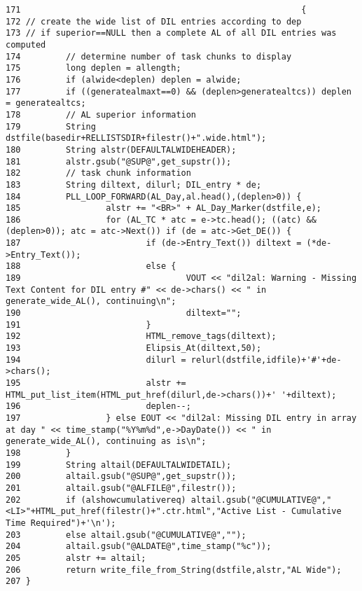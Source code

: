 \footnotesize\begin{verbatim}171                                                        {
172 // create the wide list of DIL entries according to dep
173 // if superior==NULL then a complete AL of all DIL entries was computed
174         // determine number of task chunks to display
175         long deplen = allength;
176         if (alwide<deplen) deplen = alwide;
177         if ((generatealmaxt==0) && (deplen>generatealtcs)) deplen = generatealtcs;
178         // AL superior information
179         String dstfile(basedir+RELLISTSDIR+filestr()+".wide.html");
180         String alstr(DEFAULTALWIDEHEADER);
181         alstr.gsub("@SUP@",get_supstr());
182         // task chunk information
183         String diltext, dilurl; DIL_entry * de;
184         PLL_LOOP_FORWARD(AL_Day,al.head(),(deplen>0)) {
185                 alstr += "<BR>" + AL_Day_Marker(dstfile,e);
186                 for (AL_TC * atc = e->tc.head(); ((atc) && (deplen>0)); atc = atc->Next()) if (de = atc->Get_DE()) {
187                         if (de->Entry_Text()) diltext = (*de->Entry_Text());
188                         else {
189                                 VOUT << "dil2al: Warning - Missing Text Content for DIL entry #" << de->chars() << " in generate_wide_AL(), continuing\n";
190                                 diltext="";
191                         }
192                         HTML_remove_tags(diltext);
193                         Elipsis_At(diltext,50);
194                         dilurl = relurl(dstfile,idfile)+'#'+de->chars();
195                         alstr += HTML_put_list_item(HTML_put_href(dilurl,de->chars())+' '+diltext);
196                         deplen--;
197                 } else EOUT << "dil2al: Missing DIL entry in array at day " << time_stamp("%Y%m%d",e->DayDate()) << " in generate_wide_AL(), continuing as is\n";
198         }
199         String altail(DEFAULTALWIDETAIL);
200         altail.gsub("@SUP@",get_supstr());
201         altail.gsub("@ALFILE@",filestr());
202         if (alshowcumulativereq) altail.gsub("@CUMULATIVE@","<LI>"+HTML_put_href(filestr()+".ctr.html","Active List - Cumulative Time Required")+'\n');
203         else altail.gsub("@CUMULATIVE@","");
204         altail.gsub("@ALDATE@",time_stamp("%c"));
205         alstr += altail;
206         return write_file_from_String(dstfile,alstr,"AL Wide");
207 }
\end{verbatim}\normalsize 
{}
